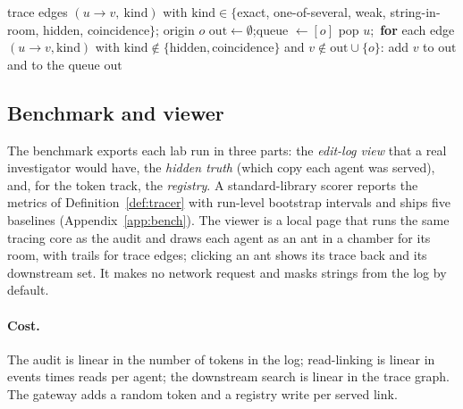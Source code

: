 \begin{algorithm}[t]
\caption{Re-check set (downstream)}\label{alg:recheck}
\begin{algorithmic}[1]
\Require trace edges $(u\to v,\ \mathrm{kind})$ with $\mathrm{kind}\in\{$exact, one-of-several, weak, string-in-room, hidden, coincidence$\}$; origin $o$
\State $\mathrm{out}\gets\emptyset$;\quad queue $\gets[o]$
  \State pop $u$;\ \textbf{for} each edge $(u\to v,\mathrm{kind})$ with $\mathrm{kind}\notin\{\text{hidden},\text{coincidence}\}$ and $v\notin\mathrm{out}\cup\{o\}$: add $v$ to $\mathrm{out}$ and to the queue
\EndWhile
\State \Return $\mathrm{out}$
\end{algorithmic}
\end{algorithm}

\subsection{Benchmark and viewer}\label{sec:benchsys}
The benchmark exports each lab run in three parts: the \emph{edit-log view} that a real investigator would have, the \emph{hidden truth} (which copy each agent was served), and, for the token track, the \emph{registry}. A standard-library scorer reports the metrics of Definition~\ref{def:tracer} with run-level bootstrap intervals and ships five baselines (Appendix~\ref{app:bench}). The viewer is a local page that runs the same tracing core as the audit and draws each agent as an ant in a chamber for its room, with trails for trace edges; clicking an ant shows its trace back and its downstream set. It makes no network request and masks strings from the log by default.

\paragraph{Cost.} The audit is linear in the number of tokens in the log; read-linking is linear in events times reads per agent; the downstream search is linear in the trace graph. The gateway adds a random token and a registry write per served link.
